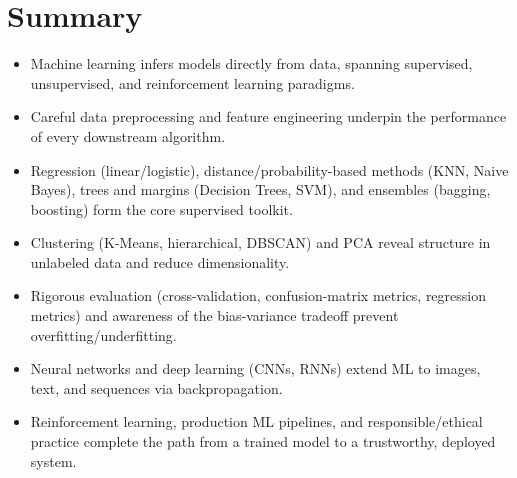 \documentclass[11pt,a4paper]{article}
\begin{document}
\section{Summary}

\begin{examplebox}
\begin{itemize}[leftmargin=*]
  \item Machine learning infers models directly from data, spanning supervised, unsupervised, and reinforcement learning paradigms.
  \item Careful data preprocessing and feature engineering underpin the performance of every downstream algorithm.
  \item Regression (linear/logistic), distance/probability-based methods (KNN, Naive Bayes), trees and margins (Decision Trees, SVM), and ensembles (bagging, boosting) form the core supervised toolkit.
  \item Clustering (K-Means, hierarchical, DBSCAN) and PCA reveal structure in unlabeled data and reduce dimensionality.
  \item Rigorous evaluation (cross-validation, confusion-matrix metrics, regression metrics) and awareness of the bias-variance tradeoff prevent overfitting/underfitting.
  \item Neural networks and deep learning (CNNs, RNNs) extend ML to images, text, and sequences via backpropagation.
  \item Reinforcement learning, production ML pipelines, and responsible/ethical practice complete the path from a trained model to a trustworthy, deployed system.
\end{itemize}
\end{examplebox}
\end{document}
